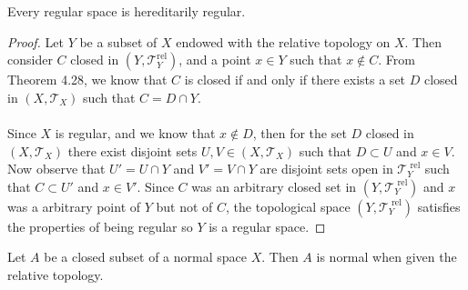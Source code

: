 \documentclass[a4paper,12pt,twoside]{hmcpset}
\begin{document}
\begin{problem}[Theorem 5.20] Every regular space is hereditarily
    regular.
\end{problem}
\begin{proof}
    Let $Y$ be a subset of $X$ endowed with the relative topology on
    $X$. Then consider $C$ closed in $(Y, \mathscr{T}_Y^{\text{
    rel}})$, and a point $x \in Y$ such that $x \notin C$. From
    Theorem 4.28, we know that $C$ is closed if and only if there
    exists a set $D$ closed in $(X, \mathscr{T}_X)$ such that $C = D
    \cap Y$. \\
    \\
    Since $X$ is regular, and we know that $x \notin D$, then for the
    set $D$ closed in $(X, \mathscr{T}_X)$ there exist disjoint sets
    $U, V \in (X, \mathscr{T}_X)$ such that $D \subset U$ and $x \in
    V$. Now observe that $U' = U \cap Y$ and $V' = V \cap Y$ are
    disjoint sets open in $\mathscr{T}_Y^{\text{ rel}}$ such that $C
    \subset U'$ and $x \in V'$. Since $C$ was an arbitrary closed set
    in $(Y, \mathscr{T}_Y^{\text{ rel}})$ and $x$ was a arbitrary
    point of $Y$ but not of $C$, the topological space $(Y,
    \mathscr{T}_Y^{\text{ rel}})$ satisfies the properties of being
    regular so $Y$ is a regular space.
\end{proof}
    
\begin{problem}[Theorem 5.23] Let $A$ be a closed subset of a normal
    space $X$. Then $A$ is normal when given the relative topology.
\end{problem}
\end{document}
